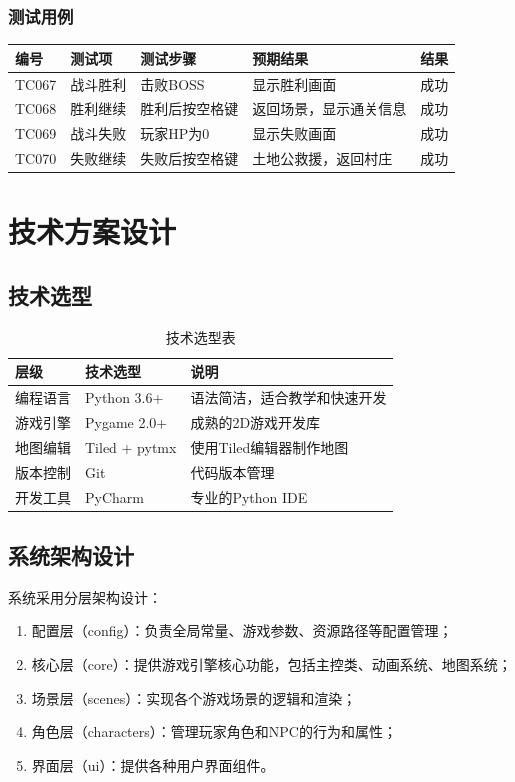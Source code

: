 \documentclass[a4paper,12pt]{article}
\begin{document}
\subsubsection{测试用例}
\begin{longtable}{p{1.2cm} p{2.8cm} p{4cm} p{3.5cm} p{1.5cm}}
\toprule
\textbf{编号} & \textbf{测试项} & \textbf{测试步骤} & \textbf{预期结果} & \textbf{结果} \\
\midrule
\endhead
TC067 & 战斗胜利 & 击败BOSS & 显示胜利画面 & 成功 \\
TC068 & 胜利继续 & 胜利后按空格键 & 返回场景，显示通关信息 & 成功 \\
TC069 & 战斗失败 & 玩家HP为0 & 显示失败画面 & 成功 \\
TC070 & 失败继续 & 失败后按空格键 & 土地公救援，返回村庄 & 成功 \\
\bottomrule
\end{longtable}

\section{技术方案设计}

\subsection{技术选型}

\begin{table}[htbp]
\centering
\caption{技术选型表}
\begin{tabular}{lll}
\toprule
\textbf{层级} & \textbf{技术选型} & \textbf{说明} \\
\midrule
编程语言 & Python 3.6+ & 语法简洁，适合教学和快速开发 \\
游戏引擎 & Pygame 2.0+ & 成熟的2D游戏开发库 \\
地图编辑 & Tiled + pytmx & 使用Tiled编辑器制作地图 \\
版本控制 & Git & 代码版本管理 \\
开发工具 & PyCharm & 专业的Python IDE \\
\bottomrule
\end{tabular}
\end{table}

\subsection{系统架构设计}
系统采用分层架构设计：
\begin{enumerate}[label=(\arabic*)]
    \item 配置层（config）：负责全局常量、游戏参数、资源路径等配置管理；
    \item 核心层（core）：提供游戏引擎核心功能，包括主控类、动画系统、地图系统；
    \item 场景层（scenes）：实现各个游戏场景的逻辑和渲染；
    \item 角色层（characters）：管理玩家角色和NPC的行为和属性；
    \item 界面层（ui）：提供各种用户界面组件。
\end{enumerate}
\end{document}
